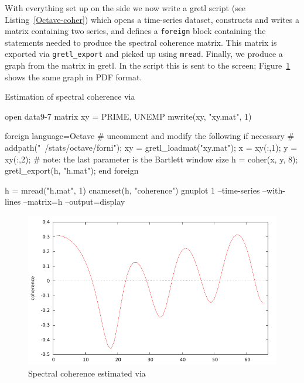 With everything set up on the  side we now write a gretl
script (see Listing~\ref{Octave-coher}) which opens a time-series
dataset, constructs and writes a matrix containing two series, and
defines a \texttt{foreign} block containing the 
statements needed to produce the spectral coherence matrix. This
matrix is exported via \verb|gretl_export| and picked up using
\texttt{mread}. Finally, we produce a graph from the matrix in gretl.
In the script this is sent to the screen; Figure~\ref{fig:coherence}
shows the same graph in PDF format.

\begin{script}[htbp]
  \caption{Estimation of spectral coherence via }
\begin{scode}
open data9-7
matrix xy = { PRIME, UNEMP }
mwrite(xy, "xy.mat", 1)

foreign language=Octave
 # uncomment and modify the following if necessary
 # addpath("~/stats/octave/forni");
 xy = gretl_loadmat("xy.mat");
 x = xy(:,1);
 y = xy(:,2);
 # note: the last parameter is the Bartlett window size
 h = coher(x, y, 8);
 gretl_export(h, "h.mat");
end foreign

h = mread("h.mat", 1)
cnameset(h, "coherence")
gnuplot 1 --time-series --with-lines --matrix=h --output=display
\end{scode}
\label{Octave-coher}
\end{script}

\begin{figure}[htbp]
  \centering
  \includegraphics{figures/coherence}
  \caption{Spectral coherence estimated via }
  \label{fig:coherence}
\end{figure}


